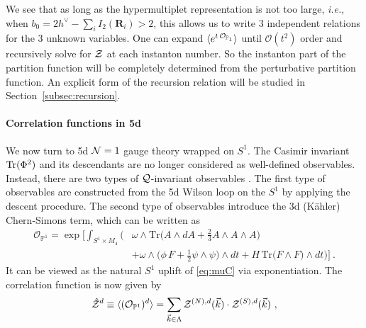 \documentclass[letterpaper, 11pt]{article}
\def\IC{\mathbb{C}}
\def\IP{\mathbb{P}}
\def\CN{{\cal N}}
\def\CO{{\cal O}}
\def\CQ{{\cal Q}}
\def\CZ{{\cal Z}}
\def\Tr{{\rm Tr}}
\begin{document}
We see that as long as the hypermultiplet representation is not too large, \emph{i.e.}, when $b_0 = 2h^\vee - \sum_i I_2(\mathbf{R}_i) > 2$, this allows us to write 3 independent relations for the 3 unknown variables. One can expand $\langle e^{t \, \CO_{\IP_1}}\rangle$ until $\mathcal{O}(t^2)$ order and recursively solve for $\CZ$ at each instanton number. So the instanton part of the partition function will be completely determined from the perturbative partition function. An explicit form of the recursion relation will be studied in Section~\ref{subsec:recursion}.

\paragraph{Correlation functions in 5d}
We now turn to 5d $\CN=1$ gauge theory wrapped on $S^1$. The Casimir invariant $\Tr (\Phi^2)$ and its descendants are no longer considered as well-defined observables. Instead, there are two types of $\CQ$-invariant observables \cite{Baulieu:1997nj}. The first type of observables are constructed from the 5d Wilson loop on the $S^1$ by applying the descent procedure. The second type of observables introduce the 3d (K\"ahler) Chern-Simons term, which can be written as \cite{Losev:1995cr,Baulieu:1997nj}
\begin{align} 
  \mathcal{O}_{\IP^1} = \exp\bigg[
    \int_{S^1 \times M_4} \bigg( & \omega \wedge \text{Tr}\Big(A \wedge dA + \frac{2}{3}A\wedge A \wedge A \Big) \\ \nonumber
     & + \omega \wedge \Big( \phi \, F + \frac{1}{2}\psi \wedge \psi \Big)\wedge dt + H\, \text{Tr}\Big( F \wedge F \Big) \wedge dt \bigg)
     \bigg] \ .
\end{align}
It can be viewed as the natural $S^1$ uplift of \eqref{eq:muC} via exponentiation. The correlation function is now given by
\begin{align}
  \label{eq:cor5d}
  \hat{\CZ}^{d} \equiv \langle (\mathcal{O}_{\IP^1})^{d}\rangle = \sum_{\vec{k} \in \Lambda}  \CZ^{(N),d}(\vec{k}) \cdot \CZ^{(S),d}(\vec{k}) \ , 
\end{align} 
%
\end{document}
